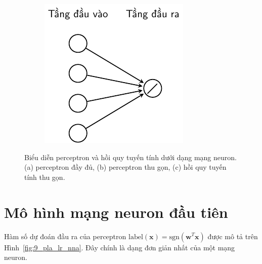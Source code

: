 \begin{figure}[h]
\begin{subfigure}{0.3\textwidth}
\caption{}
\label{fig:9_pla_lr_nnb}
\end{subfigure}
\begin{subfigure}{0.3\textwidth}
\includegraphics[width=1.02\linewidth]{Chapters/05_NeuralNetworks/09_perceptron/latex/lr_nn.pdf}
\caption{}
\label{fig:9_pla_lr_nnc}
\end{subfigure}
\caption{
Biểu diễn perceptron và hồi quy tuyến tính dưới dạng mạng neuron. (a) perceptron đầy đủ, (b) perceptron thu gọn, (c) hồi quy tuyến tính thu gọn.
}
\label{fig:9_pla_lr_nn}
\end{figure}

\section{Mô hình mạng neuron đầu tiên}
Hàm số dự đoán đầu ra của perceptron $\text{label}(\mathbf{x}) = \text{sgn}(\mathbf{w}^T\mathbf{x})$ được mô tả trên Hình~\ref{fig:9_pla_lr_nna}. Đây chính là dạng đơn giản nhất của một mạng neuron.


